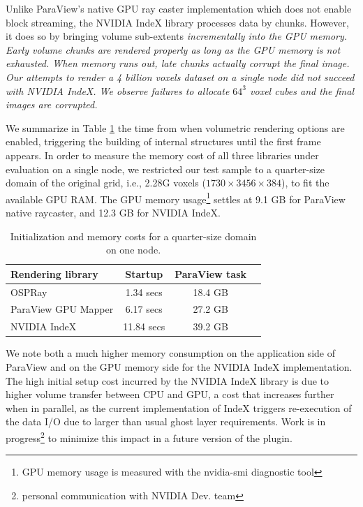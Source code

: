 \documentclass[5p,times]{elsarticle}
\begin{document}
Unlike ParaView's native GPU ray caster implementation which does not enable block
streaming, the NVIDIA IndeX library processes data by chunks. However, it does so
by bringing volume sub-extents \it{incrementally} \rm into the GPU memory.
Early volume chunks are rendered properly as long as the GPU memory is not exhausted.
When memory runs out, late chunks actually corrupt the final image. Our attempts to
render a 4 billion voxels dataset on a single node did not succeed with NVIDIA IndeX.
We observe failures to allocate $64^3$ voxel cubes and the final images are corrupted.

We summarize in Table \ref{tab:firstframe-tab} the time from when volumetric rendering options
are enabled, triggering the building of internal structures until the first frame appears.
In order to measure the memory cost of all three libraries under evaluation on a single node,
we restricted our test sample to a quarter-size domain of the original grid, i.e., 2.28G voxels
($ 1730 \times 3456 \times 384 $), to fit the available GPU RAM. The GPU memory
usage\footnote{GPU memory usage is measured with the nvidia-smi diagnostic tool}
settles at 9.1 GB for ParaView native raycaster, and 12.3 GB for NVIDIA IndeX. 

\begin{table}[htb]
  \centering
  \caption{
    Initialization and memory costs for a quarter-size domain on one node.
  }
  \label{tab:firstframe-tab}

  \begin{tabular}{lccc}
    \hline
    Rendering library & Startup & ParaView task\\
    \hline
    OSPRay & 1.34 secs &  18.4 GB \\
    ParaView GPU Mapper & 6.17 secs &  27.2 GB \\
    NVIDIA IndeX & 11.84 secs &  39.2 GB\\
    \hline

  \end{tabular}
\end{table}

We note both a much higher memory consumption on the application side of ParaView
and on the GPU memory side for the NVIDIA IndeX implementation. The high initial 
setup cost incurred by the NVIDIA IndeX library is due to higher volume transfer
between CPU and GPU, a cost that increases further when in parallel, as the current
implementation of IndeX triggers re-execution of the data I/O due to larger than
usual ghost layer requirements. Work is in progress\footnote{personal communication
with NVIDIA Dev. team} to minimize this impact in a future version of the plugin.
\end{document}
